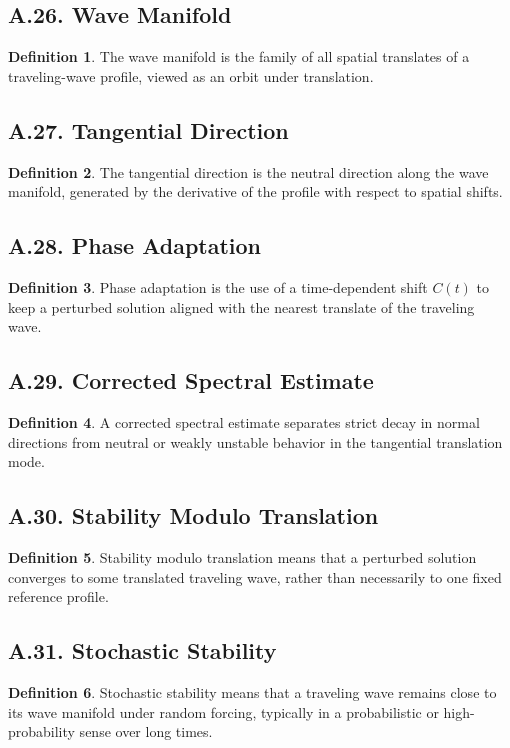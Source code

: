\documentclass[11pt]{article}
\theoremstyle{definition}
\newtheorem{definition}{Definition}
\theoremstyle{remark}
\begin{document}
\subsection*{A.26. Wave Manifold}
\begin{definition}
The wave manifold is the family of all spatial translates of a traveling-wave profile, viewed as an orbit under translation.
\end{definition}

\subsection*{A.27. Tangential Direction}
\begin{definition}
The tangential direction is the neutral direction along the wave manifold, generated by the derivative of the profile with respect to spatial shifts.
\end{definition}

\subsection*{A.28. Phase Adaptation}
\begin{definition}
Phase adaptation is the use of a time-dependent shift \(C(t)\) to keep a perturbed solution aligned with the nearest translate of the traveling wave.
\end{definition}

\subsection*{A.29. Corrected Spectral Estimate}
\begin{definition}
A corrected spectral estimate separates strict decay in normal directions from neutral or weakly unstable behavior in the tangential translation mode.
\end{definition}

\subsection*{A.30. Stability Modulo Translation}
\begin{definition}
Stability modulo translation means that a perturbed solution converges to some translated traveling wave, rather than necessarily to one fixed reference profile.
\end{definition}

\subsection*{A.31. Stochastic Stability}
\begin{definition}
Stochastic stability means that a traveling wave remains close to its wave manifold under random forcing, typically in a probabilistic or high-probability sense over long times.
\end{definition}
\end{document}
